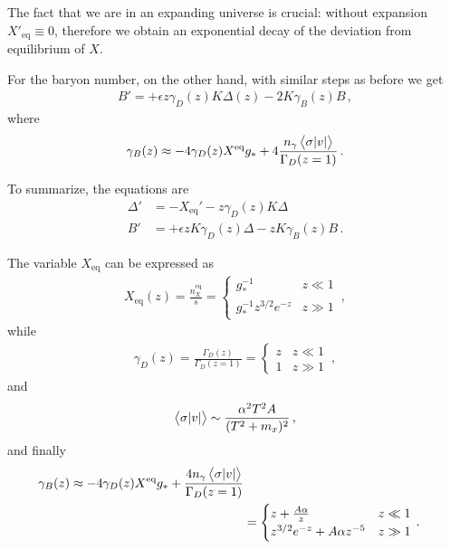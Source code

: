 \documentclass[main.tex]{subfiles}
\begin{document}
The fact that we are in an expanding universe is crucial: without expansion \(X' _{\text{eq}} \equiv 0\), therefore we obtain an exponential decay of the deviation from equilibrium of \(X\). 

For the baryon number, on the other hand, with similar steps as before we get 
%
\begin{align}
B' = + \epsilon z \gamma _D (z) K \Delta (z) - 2 K \gamma _B (z) B 
\,,
\end{align}
%
where 
%
\begin{align}
\gamma _B (z) \approx - 4 \gamma _D (z) X^{\text{eq}} g_* + 4 \frac{n_\gamma \expval{\sigma \abs{v}}}{\Gamma _D (z=1)}
\,.
\end{align}

To summarize, the equations are 
%
\begin{align}
\Delta' &= - X _{\text{eq}}' - z \gamma _D (z) K \Delta  \\
B' &= + \epsilon z K \gamma _D (z) \Delta - z K \gamma _B (z) B
\,.
\end{align}

The variable \(X _{\text{eq}}\) can be expressed as 
%
\begin{align}
X _{\text{eq}} (z) = \frac{n_X^{\text{eq}}}{s} = \begin{cases}
    g_*^{-1} & z\ll 1  \\
    g_*^{-1}z^{3/2} e^{-z} & z \gg 1 
\end{cases}
\,,
\end{align}
%
while 
%
\begin{align}
\gamma _D (z) = \frac{\Gamma _D(z)}{\Gamma _D(z=1)} = \begin{cases}
    z & z\ll 1  \\
    1 & z\gg 1
\end{cases}
\,,
\end{align}
%
and 
%
\begin{align}
\expval{ \sigma \abs{v}} \sim \frac{\alpha^2 T^2 A}{(T^2 +m_x)^2}
\,,
\end{align}
%
and finally
%
\begin{align}
\gamma _B (z) \approx -4 \gamma _D (z) X^{\text{eq}} g_* + \frac{4 n_\gamma \expval{ \sigma \abs{v}}}{\Gamma _D (z=1)}  \\
&= \begin{cases}
    z + \frac{A \alpha }{z} & z \ll 1  \\
    z^{3/2} e^{-z} + A \alpha z^{-5} & z \gg 1
\end{cases}
\,.
\end{align}
\end{document}
